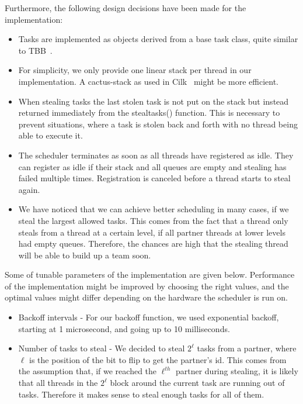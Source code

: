 \documentclass[preprint]{sigplanconf}
\begin{document}
Furthermore, the following design decisions have been made for the
implementation:

\begin{itemize}
\item Tasks are implemented as objects derived from a base task class,
quite similar to TBB~\cite{KukanovVoss07}.
\item For simplicity, we only provide one linear stack per thread in
our implementation. A cactus-stack as used in
Cilk~\cite{BlumofeJoergKuszmaulLeisersonRandallZhou96} might be more
efficient.
\item When stealing tasks the last stolen task is not put on the
stack but instead returned immediately from the stealtasks()
function. This is necessary to prevent situations, where a task is
stolen back and forth with no thread being able to execute it.
\item The scheduler terminates as soon as all threads have registered
as idle. They can register as idle if their stack and all queues are
empty and stealing has failed multiple times. Registration is
canceled before a thread starts to steal again.
\item
We have noticed that we can achieve better scheduling in many
cases, if we steal the largest allowed tasks. This comes from the fact
that a thread only steals from a thread at a certain level, if all
partner threads at lower levels had empty queues. Therefore, the
chances are high that the stealing thread will be able to build up a
team soon.
\end{itemize}

Some of tunable parameters of the implementation are given
below. Performance of the implementation might be improved by choosing
the right values, and the optimal values might differ depending on the
hardware the scheduler is run on.

\begin{itemize}
\item Backoff intervals - For our backoff function, we used
exponential backoff, starting at 1 microsecond, and going up to 10
milliseconds.
\item Number of tasks to steal - We decided to steal $2^{\ell}$ tasks
from a partner, where $\ell$ is the position of the bit to flip to get
the partner's id. This comes from the assumption that, if we reached
the $\ell^{th}$ partner during stealing, it is likely that all threads
in the $2^{\ell}$ block around the current task are running out of
tasks. Therefore it makes sense to steal enough tasks for all of them.
\end{itemize}
\end{document}
